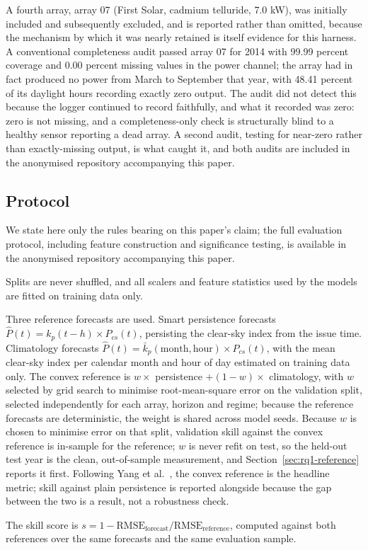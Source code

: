 A fourth array, array 07 (First Solar, cadmium telluride, 7.0 kW), was
initially included and subsequently excluded, and is reported rather
than omitted, because the mechanism by which it was nearly retained is
itself evidence for this harness. A conventional completeness audit
passed array 07 for 2014 with 99.99 percent coverage and 0.00 percent
missing values in the power channel; the array had in fact produced no
power from March to September that year, with 48.41 percent of its
daylight hours recording exactly zero output. The audit did not detect
this because the logger continued to record faithfully, and what it
recorded was zero: zero is not missing, and a completeness-only check
is structurally blind to a healthy sensor reporting a dead array. A
second audit, testing for near-zero rather than exactly-missing output,
is what caught it, and both audits are included in the anonymised
repository accompanying this paper.

\subsection{Protocol}
\label{sec:protocol}

We state here only the rules bearing on this paper's claim; the full
evaluation protocol, including feature construction and significance
testing, is available in the anonymised repository accompanying this
paper.

Splits are never shuffled, and all scalers and feature statistics used
by the models are fitted on training data only.

Three reference forecasts are used. Smart persistence forecasts
$\hat{P}(t) = k_p(t-h) \times P_{cs}(t)$, persisting the clear-sky
index from the issue time. Climatology forecasts $\hat{P}(t) =
\bar{k}_p(\text{month}, \text{hour}) \times P_{cs}(t)$, with the mean
clear-sky index per calendar month and hour of day estimated on
training data only. The convex reference is $w \times$ persistence $+
(1-w) \times$ climatology, with $w$ selected by grid search to
minimise root-mean-square error on the validation split, selected
independently for each array, horizon and regime; because the
reference forecasts are deterministic, the weight is shared across
model seeds. Because $w$ is chosen to minimise error on that split,
validation skill against the
convex reference is in-sample for the reference; $w$ is never refit on
test, so the held-out test year is the clean, out-of-sample
measurement, and Section~\ref{sec:rq1-reference} reports it first.
Following Yang et al.~\cite{yang2020verification}, the convex
reference is the headline metric; skill against plain persistence is
reported alongside because the gap between the two is a result, not a
robustness check.

The skill score is $s = 1 - \text{RMSE}_{\text{forecast}} /
\text{RMSE}_{\text{reference}}$, computed against both references over
the same forecasts and the same evaluation sample.
